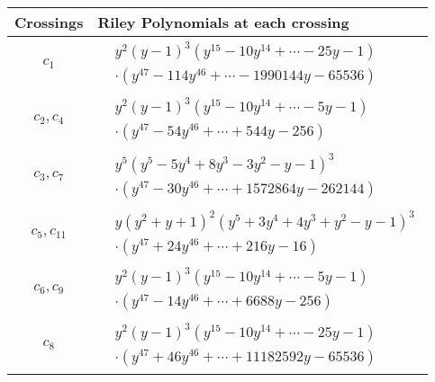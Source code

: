 \documentclass[1p]{elsarticle_modified}
\theoremstyle{definition}
\begin{document}
\begin{tabular}{m{50pt}|m{274pt}}
Crossings & \hspace{64pt}Riley Polynomials at each crossing \\
\hline $$\begin{aligned}c_{1}\end{aligned}$$&$\begin{aligned}
&y^2(y-1)^3(y^{15}-10 y^{14}+\cdots-25 y-1)\\
&\cdot(y^{47}-114 y^{46}+\cdots-1990144 y-65536)
\end{aligned}$\\
\hline $$\begin{aligned}c_{2},c_{4}\end{aligned}$$&$\begin{aligned}
&y^2(y-1)^3(y^{15}-10 y^{14}+\cdots-5 y-1)\\
&\cdot(y^{47}-54 y^{46}+\cdots+544 y-256)
\end{aligned}$\\
\hline $$\begin{aligned}c_{3},c_{7}\end{aligned}$$&$\begin{aligned}
&y^5(y^5-5 y^4+8 y^3-3 y^2- y-1)^3\\
&\cdot(y^{47}-30 y^{46}+\cdots+1572864 y-262144)
\end{aligned}$\\
\hline $$\begin{aligned}c_{5},c_{11}\end{aligned}$$&$\begin{aligned}
&y(y^2+y+1)^2(y^5+3 y^4+4 y^3+y^2- y-1)^3\\
&\cdot(y^{47}+24 y^{46}+\cdots+216 y-16)
\end{aligned}$\\
\hline $$\begin{aligned}c_{6},c_{9}\end{aligned}$$&$\begin{aligned}
&y^2(y-1)^3(y^{15}-10 y^{14}+\cdots-5 y-1)\\
&\cdot(y^{47}-14 y^{46}+\cdots+6688 y-256)
\end{aligned}$\\
\hline $$\begin{aligned}c_{8}\end{aligned}$$&$\begin{aligned}
&y^2(y-1)^3(y^{15}-10 y^{14}+\cdots-25 y-1)\\
&\cdot(y^{47}+46 y^{46}+\cdots+11182592 y-65536)
\end{aligned}$\\

\end{tabular}
\end{document}
